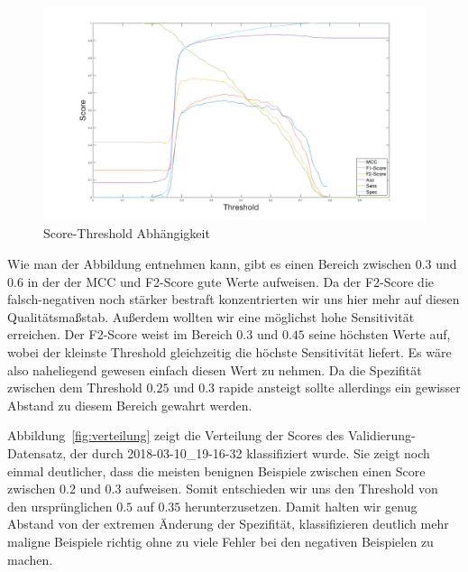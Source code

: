 \begin{figure}[htb!]
	\begin{center}
		\includegraphics[width=\textwidth]{./pics/evaluation/treshold.png}
		\caption{Score-Threshold Abhängigkeit}
		\label{fig:threshold}
    \end{center}
\end{figure}

Wie man der Abbildung entnehmen kann, gibt es einen Bereich zwischen $0.3$ und $0.6$ in der der MCC und F2-Score gute Werte aufweisen. Da der F2-Score die falsch-negativen noch stärker bestraft konzentrierten wir uns hier mehr auf diesen Qualitätsmaßstab. Außerdem wollten wir eine möglichst hohe Sensitivität erreichen. Der F2-Score weist im Bereich $0.3$ und $0.45$ seine höchsten Werte auf, wobei der kleinste Threshold gleichzeitig die höchste Sensitivität liefert. Es wäre also naheliegend gewesen einfach diesen Wert zu nehmen. Da die Spezifität zwischen dem Threshold $0.25$ und $0.3$ rapide ansteigt sollte allerdings ein gewisser Abstand zu diesem Bereich gewahrt werden. 

Abbildung~\ref{fig:verteilung} zeigt die Verteilung der Scores des Validierung-Datensatz, der durch 2018-03-10\_19-16-32 klassifiziert wurde. Sie zeigt noch einmal deutlicher, dass die meisten benignen Beispiele zwischen einen Score zwischen $0.2$ und $0.3$ aufweisen. Somit entschieden wir uns den Threshold von den ursprünglichen $0.5$ auf $0.35$ herunterzusetzen. Damit halten wir genug Abstand von der extremen Änderung der Spezifität, klassifizieren deutlich mehr maligne Beispiele richtig ohne zu viele Fehler bei den negativen Beispielen zu machen. 


